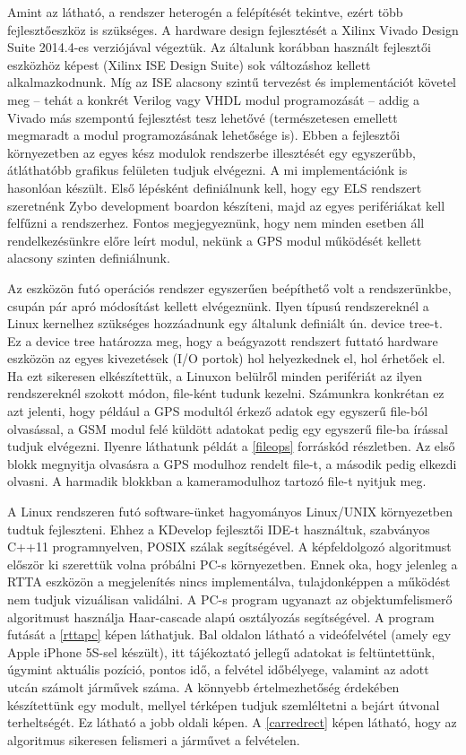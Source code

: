 \documentclass[a4paper,12pt]{report}
\begin{document}
Amint az látható, a rendszer heterogén a felépítését tekintve, ezért több fejlesztőeszköz is szükséges. A hardware design fejlesztését a Xilinx Vivado Design Suite 2014.4-es verziójával végeztük. Az általunk korábban használt fejlesztői eszközhöz képest (Xilinx ISE Design Suite) sok változáshoz kellett alkalmazkodnunk. Míg az ISE alacsony szintű tervezést és implementációt követel meg -- tehát a konkrét Verilog vagy VHDL modul programozását -- addig a Vivado más szempontú fejlesztést tesz lehetővé (természetesen emellett megmaradt a modul programozásának lehetősége is). Ebben a fejlesztői környezetben az egyes kész modulok rendszerbe illesztését egy egyszerűbb, átláthatóbb grafikus felületen tudjuk elvégezni. A mi implementációnk is hasonlóan készült. Első lépésként definiálnunk kell, hogy egy ELS rendszert szeretnénk Zybo development boardon készíteni, majd az egyes perifériákat kell felfűzni a rendszerhez. Fontos megjegyeznünk, hogy nem minden esetben áll rendelkezésünkre előre leírt modul, nekünk a GPS modul működését kellett alacsony szinten definiálnunk.

Az eszközön futó operációs rendszer egyszerűen beépíthető volt a rendszerünkbe, csupán pár apró módosítást kellett elvégeznünk. Ilyen típusú rendszereknél a Linux kernelhez szükséges hozzáadnunk egy általunk definiált ún. device tree-t. Ez a device tree határozza meg, hogy a beágyazott rendszert futtató hardware eszközön az egyes kivezetések (I/O portok) hol helyezkednek el, hol érhetőek el. Ha ezt sikeresen elkészítettük, a Linuxon belülről minden perifériát az ilyen rendszereknél szokott módon, file-ként tudunk kezelni. Számunkra konkrétan ez azt jelenti, hogy például a GPS modultól érkező adatok egy egyszerű file-ból olvasással, a GSM modul felé küldött adatokat pedig egy egyszerű file-ba írással tudjuk elvégezni. Ilyenre láthatunk példát a \ref{fileops} forráskód részletben. Az első blokk megnyitja olvasásra a GPS modulhoz rendelt file-t, a második pedig elkezdi olvasni. A harmadik blokkban a kameramodulhoz tartozó file-t nyitjuk meg.



A Linux rendszeren futó software-ünket hagyományos Linux/UNIX környezetben tudtuk fejleszteni. Ehhez a KDevelop fejlesztői IDE-t használtuk, szabványos C++11 programnyelven, POSIX szálak segítségével. A képfeldolgozó algoritmust először ki szerettük volna próbálni PC-s környezetben. Ennek oka, hogy jelenleg a RTTA eszközön a megjelenítés nincs implementálva, tulajdonképpen a működést nem tudjuk vizuálisan validálni. A PC-s program ugyanazt az objektumfelismerő algoritmust használja Haar-cascade alapú osztályozás segítségével. A program futását a \ref{rttapc} képen láthatjuk. Bal oldalon látható a videófelvétel (amely egy Apple iPhone 5S-sel készült), itt tájékoztató jellegű adatokat is feltüntettünk, úgymint aktuális pozíció, pontos idő, a felvétel időbélyege, valamint az adott utcán számolt járművek száma. A könnyebb értelmezhetőség érdekében készítettünk egy modult, mellyel térképen tudjuk szemléltetni a bejárt útvonal terheltségét. Ez látható a jobb oldali képen. A \ref{carredrect} képen látható, hogy az algoritmus sikeresen felismeri a járművet a felvételen.
\end{document}

